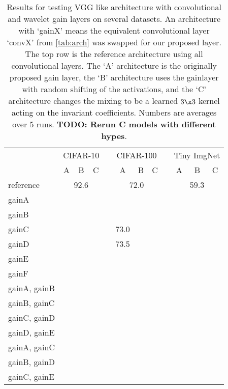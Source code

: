 \begin{table}
  \renewcommand{\arraystretch}{1.2}
  \centering
  \caption{Results for testing VGG like architecture with convolutional and
  wavelet gain layers on several datasets. An architecture with `gainX' means the
  equivalent convolutional layer `convX' from \autoref{tab:arch} was swapped for
  our proposed layer. The top row is the reference architecture using all
  convolutional layers. The `A' architecture is the originally proposed gain
  layer, the `B' architecture uses the gainlayer with random shifting of the
  activations, and the `C' architecture changes the mixing to be a learned
  $3\x3$ kernel acting on the invariant coefficients. Numbers are averages over
  5 runs. \textbf{TODO: Rerun C models with different hypes}.}
  \begin{tabular}{@{}lccclccclccc@{}}
    \toprule
    & \multicolumn{3}{c}{CIFAR-10} & \phantom{abc} & \multicolumn{3}{c}{CIFAR-100} & \phantom{abc} & \multicolumn{3}{c}{Tiny ImgNet} \\ \cline{2-4}\cline{6-8}\cline{10-12}
    \phantom{abc} & A  & B & C &&  A & B & C && A & B & C \\ \midrule
    reference & \multicolumn{3}{c}{92.6} && \multicolumn{3}{c}{72.0} && \multicolumn{3}{c}{59.3} \\ \midrule
    gainA        & & & && & & && & & \\
    gainB        & & & && & & && & & \\
    gainC        & & & && 73.0 & & && & & \\
    gainD        & & & && 73.5 & & && & & \\
    gainE        & & & && & & && & & \\
    gainF        & & & && & & && & & \\
    gainA, gainB & & & && & & && & & \\
    gainB, gainC & & & && & & && & & \\
    gainC, gainD & & & && & & && & & \\
    gainD, gainE & & & && & & && & & \\
    gainA, gainC & & & && & & && & & \\
    gainB, gainD & & & && & & && & & \\
    gainC, gainE & & & && & & && & & \\ \bottomrule
  \end{tabular}\label{tab:ch6:ablation_results}
\end{table}

